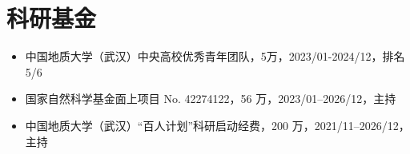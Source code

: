 \section{科研基金}

\begin{itemize}
\item 中国地质大学（武汉）中央高校优秀青年团队，5万，2023/01-2024/12，排名 5/6
\item 国家自然科学基金面上项目 No. 42274122，56 万，2023/01--2026/12，主持
\item 中国地质大学（武汉）“百人计划”科研启动经费，200 万，2021/11--2026/12，主持
\end{itemize}
